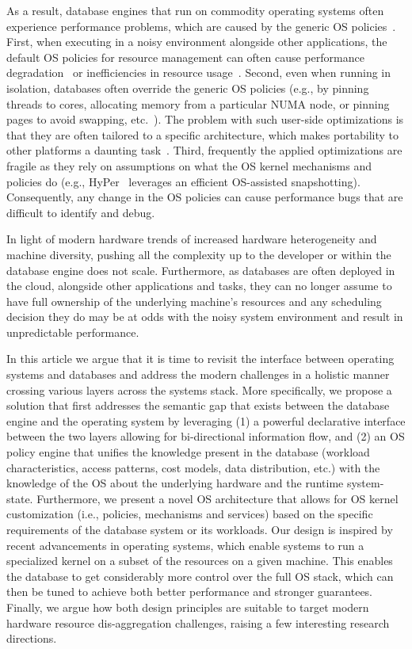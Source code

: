 \documentclass[11pt]{article}
\begin{document}
As a result, database engines that run on commodity operating systems often experience
performance problems, which are caused by the generic OS policies~\cite{Stonebraker:1981}. 
First, when executing in a noisy environment alongside other applications, the 
default OS policies for resource management can often cause performance 
degradation~\cite{Shoal} or inefficiencies in resource usage~\cite{Giceva:damon16,Lozi:eurosys16}. 
Second, even when running in isolation, databases often override the generic OS policies
(e.g., by pinning threads to cores, allocating memory from a particular NUMA node, or 
pinning pages to avoid swapping, etc.~\cite{Porobic:icde14,Kimura:2015}). The 
problem with such user-side optimizations is that they are often tailored to a 
specific architecture, which makes portability to other platforms a daunting
task~\cite{Makreshanski:vldb15,satish:sigmod10}. 
Third, frequently the applied optimizations are fragile as they rely on assumptions on
what the OS kernel mechanisms and policies do (e.g., HyPer~\cite{HyPer} leverages
an efficient OS-assisted snapshotting). Consequently, any change in the OS policies
can cause performance bugs that are difficult to identify and debug.

In light of modern hardware trends of increased hardware heterogeneity and machine 
diversity, pushing all the complexity up to the developer or within the database 
engine does not scale. Furthermore, as databases are often deployed in the cloud,
alongside other applications and tasks, they can no longer assume to have full
ownership of the underlying machine's resources and any scheduling decision they do
may be at odds with the noisy system environment and result in unpredictable 
performance.

In this article we argue that it is time to revisit the interface between operating
systems and databases and address the modern challenges in a holistic manner crossing
various layers across the systems stack. More specifically, we propose a solution that
first addresses the semantic gap that exists between the database engine and the 
operating system by leveraging (1) a powerful declarative interface between the two
layers allowing for bi-directional information flow, and (2) an OS policy engine that 
unifies the knowledge present in the database (workload characteristics, access patterns,
cost models, data distribution, etc.) with the knowledge of the OS about the 
underlying hardware and the runtime system-state. 
Furthermore, we present a novel OS architecture that allows for OS kernel customization
(i.e., policies, mechanisms and services) based on the specific requirements of 
the database system or its workloads. Our design is inspired by recent advancements
in operating systems, which enable systems to run a specialized kernel on a subset
of the resources on a given machine. This enables the database to get considerably
more control over the full OS stack, which can then be tuned to achieve both better
performance and stronger guarantees. 
Finally, we argue how both design principles are suitable to target modern hardware 
resource dis-aggregation challenges, raising a few interesting research directions.
\end{document}
